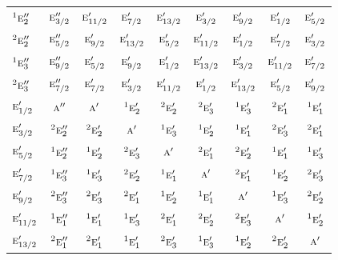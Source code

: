 \documentclass[10pt,a4paper]{article}
\numberwithin{equation}{section}
\newcommand{\irr}[1]{\text{\normalfont\scshape #1}}
\newcommand{\conjpair}[1]{{}^{#1}}
\begin{document}
{\begin{longtable}{@{}lcccccccc@{}}
$\conjpair{1}\irr{e}_{2}''$ & $\irr{e}_{3/2}''$ & $\irr{e}_{11/2}'$ & $\irr{e}_{7/2}'$ & $\irr{e}_{13/2}'$ & $\irr{e}_{3/2}'$ & $\irr{e}_{9/2}'$ & $\irr{e}_{1/2}'$ & $\irr{e}_{5/2}'$\\
$\conjpair{2}\irr{e}_{2}''$ & $\irr{e}_{5/2}''$ & $\irr{e}_{9/2}'$ & $\irr{e}_{13/2}'$ & $\irr{e}_{5/2}'$ & $\irr{e}_{11/2}'$ & $\irr{e}_{1/2}'$ & $\irr{e}_{7/2}'$ & $\irr{e}_{3/2}'$\\
$\conjpair{1}\irr{e}_{3}''$ & $\irr{e}_{9/2}''$ & $\irr{e}_{5/2}'$ & $\irr{e}_{9/2}'$ & $\irr{e}_{1/2}'$ & $\irr{e}_{13/2}'$ & $\irr{e}_{3/2}'$ & $\irr{e}_{11/2}'$ & $\irr{e}_{7/2}'$\\
$\conjpair{2}\irr{e}_{3}''$ & $\irr{e}_{7/2}''$ & $\irr{e}_{7/2}'$ & $\irr{e}_{3/2}'$ & $\irr{e}_{11/2}'$ & $\irr{e}_{1/2}'$ & $\irr{e}_{13/2}'$ & $\irr{e}_{5/2}'$ & $\irr{e}_{9/2}'$\\
$\irr{e}_{1/2}'$ & $\irr{a}''$ & $\irr{a}'$ & $\conjpair{1}\irr{e}_{2}'$ & $\conjpair{2}\irr{e}_{2}'$ & $\conjpair{2}\irr{e}_{3}'$ & $\conjpair{1}\irr{e}_{3}'$ & $\conjpair{2}\irr{e}_{1}'$ & $\conjpair{1}\irr{e}_{1}'$\\
$\irr{e}_{3/2}'$ & $\conjpair{2}\irr{e}_{2}''$ & $\conjpair{2}\irr{e}_{2}'$ & $\irr{a}'$ & $\conjpair{1}\irr{e}_{3}'$ & $\conjpair{1}\irr{e}_{2}'$ & $\conjpair{1}\irr{e}_{1}'$ & $\conjpair{2}\irr{e}_{3}'$ & $\conjpair{2}\irr{e}_{1}'$\\
$\irr{e}_{5/2}'$ & $\conjpair{1}\irr{e}_{2}''$ & $\conjpair{1}\irr{e}_{2}'$ & $\conjpair{2}\irr{e}_{3}'$ & $\irr{a}'$ & $\conjpair{2}\irr{e}_{1}'$ & $\conjpair{2}\irr{e}_{2}'$ & $\conjpair{1}\irr{e}_{1}'$ & $\conjpair{1}\irr{e}_{3}'$\\
$\irr{e}_{7/2}'$ & $\conjpair{1}\irr{e}_{3}''$ & $\conjpair{1}\irr{e}_{3}'$ & $\conjpair{2}\irr{e}_{2}'$ & $\conjpair{1}\irr{e}_{1}'$ & $\irr{a}'$ & $\conjpair{2}\irr{e}_{1}'$ & $\conjpair{1}\irr{e}_{2}'$ & $\conjpair{2}\irr{e}_{3}'$\\
$\irr{e}_{9/2}'$ & $\conjpair{2}\irr{e}_{3}''$ & $\conjpair{2}\irr{e}_{3}'$ & $\conjpair{2}\irr{e}_{1}'$ & $\conjpair{1}\irr{e}_{2}'$ & $\conjpair{1}\irr{e}_{1}'$ & $\irr{a}'$ & $\conjpair{1}\irr{e}_{3}'$ & $\conjpair{2}\irr{e}_{2}'$\\
$\irr{e}_{11/2}'$ & $\conjpair{1}\irr{e}_{1}''$ & $\conjpair{1}\irr{e}_{1}'$ & $\conjpair{1}\irr{e}_{3}'$ & $\conjpair{2}\irr{e}_{1}'$ & $\conjpair{2}\irr{e}_{2}'$ & $\conjpair{2}\irr{e}_{3}'$ & $\irr{a}'$ & $\conjpair{1}\irr{e}_{2}'$\\
$\irr{e}_{13/2}'$ & $\conjpair{2}\irr{e}_{1}''$ & $\conjpair{2}\irr{e}_{1}'$ & $\conjpair{1}\irr{e}_{1}'$ & $\conjpair{2}\irr{e}_{3}'$ & $\conjpair{1}\irr{e}_{3}'$ & $\conjpair{1}\irr{e}_{2}'$ & $\conjpair{2}\irr{e}_{2}'$ & $\irr{a}'$\\

\end{longtable}}
\end{document}
